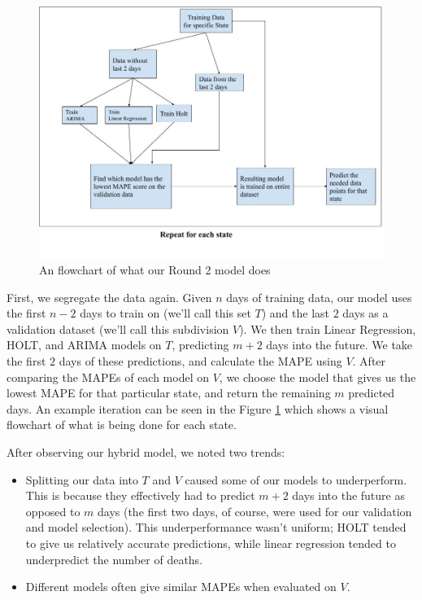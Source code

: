 \documentclass[sigconf,nonacm]{acmart}
\begin{document}
\begin{figure}
  \centering
  \includegraphics[width=\linewidth]{figures/Final_model.jpg}
  \caption{An flowchart of what our Round 2 model does}
  \label{fig:model_final}
\end{figure}

First, we segregate the data again. Given $n$ days of training data, our model
uses the first $n-2$ days to train on (we'll call this set $T$) and the last
$2$ days as a validation dataset (we'll call this subdivision $V$). We then
train Linear Regression, HOLT, and ARIMA models on $T$, predicting $m+2$ days
into the future. We take the first $2$ days of these predictions, and calculate
the MAPE using $V$. After comparing the MAPEs of each model on $V$, we choose
the model that gives us the lowest MAPE for that particular state, and return
the remaining $m$ predicted days. An example iteration can be seen in the 
Figure \ref{fig:model_final} which shows a visual flowchart of what is being done
for each state.

After observing our hybrid model, we noted two trends: 
\begin{itemize}
\item 
Splitting our data into $T$ and $V$ caused some of our models to
underperform. This is because they effectively had to predict $m+2$ days into
the future as opposed to $m$ days (the first two days, of course, were used for
our validation and model selection). This underperformance wasn't uniform;
HOLT tended to give us relatively accurate predictions, while linear regression
tended to underpredict the number of deaths. 
\item
Different models often give similar MAPEs when evaluated on $V$. 
\end{itemize}
\end{document}
